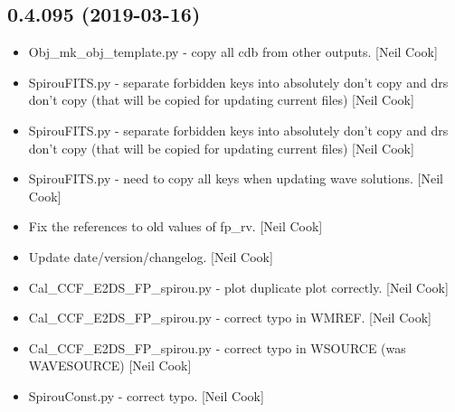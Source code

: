 \documentclass[a4paper,10pt,english]{report}
\begin{document}
\subsection{0.4.095 (2019-03-16)}
\label{\detokenize{misc/changelog:id163}}\begin{itemize}
\item {} 
Obj\_mk\_obj\_template.py - copy all cdb from other outputs. {[}Neil Cook{]}

\item {} 
SpirouFITS.py - separate forbidden keys into absolutely don’t copy and
drs don’t copy (that will be copied for updating current files) {[}Neil
Cook{]}

\item {} 
SpirouFITS.py - separate forbidden keys into absolutely don’t copy and
drs don’t copy (that will be copied for updating current files) {[}Neil
Cook{]}

\item {} 
SpirouFITS.py - need to copy all keys when updating wave solutions.
{[}Neil Cook{]}

\item {} 
Fix the references to old values of fp\_rv. {[}Neil Cook{]}

\item {} 
Update date/version/changelog. {[}Neil Cook{]}

\item {} 
Cal\_CCF\_E2DS\_FP\_spirou.py - plot duplicate plot correctly. {[}Neil Cook{]}

\item {} 
Cal\_CCF\_E2DS\_FP\_spirou.py - correct typo in WMREF. {[}Neil Cook{]}

\item {} 
Cal\_CCF\_E2DS\_FP\_spirou.py - correct typo in WSOURCE (was WAVESOURCE)
{[}Neil Cook{]}

\item {} 
SpirouConst.py - correct typo. {[}Neil Cook{]}

\end{itemize}
\end{document}
